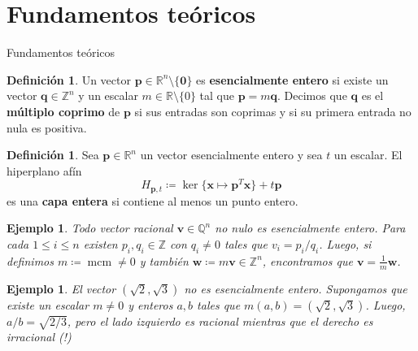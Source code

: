 \documentclass[aspectratio=169]{beamer}
\newtheorem{sexample}[theorem]{Ejemplo}
\theoremstyle{definition}
\newtheorem{sdefinition}[theorem]{Definición}
\newcommand{\Z}{\mathbb{Z}}
\newcommand{\Q}{\mathbb{Q}}
\newcommand{\R}{\mathbb{R}}
\renewcommand{\ker}{\operatorname{ker}}
\renewcommand{\vec}[1]{\boldsymbol{#1}}
\newcommand{\braces}[1]{\lbrace #1 \rbrace}
\newcommand{\paren}[1]{\left( #1 \right)}
\newcommand{\clayer}[2]{H_{#1, #2}}
\newcommand{\lcm}[1]{\mathop{\mathrm{mcm}{\left\lbrace #1 \right\rbrace}}}
\begin{document}
\section{Fundamentos teóricos}

\begin{frame}
	\centering
	\Large{Fundamentos teóricos}
\end{frame}

\begin{frame}
	\begin{sdefinition}
		Un vector $\vec{p} \in \R^n\setminus\braces{\vec{0}}$ es
		\textbf{esencialmente entero} si existe un vector $\vec{q} \in \Z^n$ y
		un escalar $m \in \R \setminus\braces{0}$ tal que $\vec{p} =
		m\vec{q}$. Decimos que $\vec{q}$ es el \textbf{múltiplo coprimo} de
		$\vec{p}$ si sus entradas son coprimas y si su primera entrada no nula
		es positiva.
	\end{sdefinition}

	\begin{sdefinition}
		Sea $\vec{p} \in \R^n$ un vector esencialmente entero y sea $t$ un escalar. El hiperplano afín
		\begin{equation*}
			\clayer{\vec{p}}{t} \coloneq \ker\braces{\vec{x} \mapsto \vec{p}^T\vec{x}} + t\vec{p}
		\end{equation*}
		es una \textbf{capa entera} si contiene al menos un punto entero.
	\end{sdefinition}
\end{frame}

\begin{frame}
	\begin{sexample}
		Todo vector racional $\vec{v} \in \Q^n$  no nulo es esencialmente
		entero. Para cada $1 \leq i \leq n$ existen $p_i, q_i \in
		\Z$ con $q_i \neq 0$ tales que $v_i = p_i/q_i$. Luego, si definimos $m \coloneq \lcm{q_1,
		\ldots, q_n} \neq 0$ y también $\vec{w} \coloneq m\vec{v} \in \Z^n$, encontramos que $\vec{v} =
		\frac{1}{m}\vec{w}$.
	\end{sexample}
	\begin{sexample}
		El vector $\paren{\sqrt{2}, \sqrt{3}}$ no es esencialmente entero. Supongamos que existe un
		escalar $m \neq 0$ y enteros $a, b$ tales que $m(a, b) = \paren{\sqrt{2}, \sqrt{3}}$. Luego,
		$a/b = \sqrt{2/3}$, pero el lado izquierdo es racional mientras que el derecho es
		irracional (!)
	\end{sexample}
\end{frame}
\end{document}

